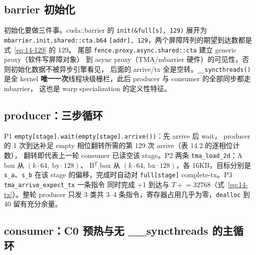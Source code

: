 \subsection{barrier 初始化}



初始化要做三件事。cuda::barrier 的 \texttt{init\allowbreak{}(\&full[s],\allowbreak{} 129)}
展开为 \texttt{mbarrier.\allowbreak{}init.\allowbreak{}shared::\allowbreak{}cta.\allowbreak{}b64}
\texttt{[addr], 129}，两个屏障阵列的期望到达数都是式~\ref{eq:14-129} 的 129。
尾部 \texttt{fence.\allowbreak{}proxy.\allowbreak{}async.\allowbreak{}shared::\allowbreak{}cta} 建立 generic proxy（软件写屏障对象）
到 async proxy（TMA/mbarrier 硬件）的可见性，否则初始化数据不被异步引擎看见，
后面的 arrive/tx 全是空转。\texttt{\_\allowbreak{}\_\allowbreak{}syncthreads\allowbreak{}()} 是全 kernel
\textbf{唯一一次}线程块级栅栏，此后 producer 与 consumer 的全部同步都走 mbarrier，
这也是 warp specialization 的定义性特征。

\subsection{producer：三步循环}



P1 \texttt{empty[stage].\allowbreak{}wait\allowbreak{}(empty[stage].\allowbreak{}arrive\allowbreak{}())}：先 arrive 后 wait，
producer 的 1 次到达补足 empty 相位翻转所需的第 129 次 arrive（表 14.2 的逐相位计数），
翻转即代表上一轮 consumer 已读空该 stage。P2 两条
\texttt{tma\_load\_2d}：A box 从 $(k \cdot 64,\ \mathrm{by} \cdot 128)$、
B$^T$ box 从 $(k \cdot 64,\ \mathrm{bx} \cdot 128)$，各 16KB，目标分别是
\texttt{s\_a}、\texttt{s\_b} 在该 stage 的偏移，完成时自动对
\texttt{full[stage]} complete-tx。P3 \texttt{tma\_\allowbreak{}arrive\_\allowbreak{}expect\_\allowbreak{}tx} 一条指令
同时完成 +1 到达与 $T \mathrel{+}= 32768$（式~\ref{eq:14-tx}）。整轮
producer 只发 3 类共 3--4 条指令，寄存器占用几乎为零，\texttt{dealloc} 到 40
留有充分余量。

\subsection{consumer：C0 预热与无 \_\_syncthreads 的主循环}

